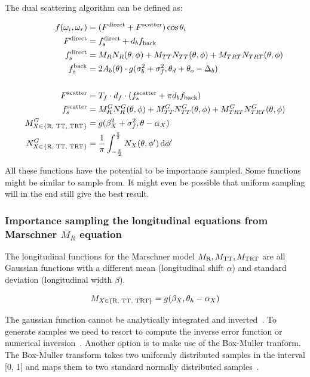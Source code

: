 \documentclass[12pt,a4paper,twoside]{article}
\begin{document}
The dual scattering algorithm can be defined as:

\begin{align}
f(\omega_i, \omega_r) & = (F^{\textnormal{direct}} + F^{\textnormal{scatter}}) \cos \theta_i\\
F^{\textnormal{direct}} & = f_s^{\textnormal{direct}} + d_b f_{\textnormal{back}}\\
f^{\textnormal{direct}}_s & = M_RN_R(\theta, \phi) + M_{TT}N_{TT}(\theta, \phi) + M_{TRT}N_{TRT}(\theta,\phi)\\
f^{\textnormal{back}}_s & = 2A_b(\theta) \cdot g(\sigma_b^2 + \sigma_f^2, \theta_d + \theta_o -\Delta_b)\\
\\
F^{\textnormal{scatter}} & = T_f \cdot d_f \cdot (f^{\textnormal{scatter}}_s + \pi d_b f_{\textnormal{back}})\\
f^{\textnormal{scatter}}_s & = M^G_RN^G_R(\theta, \phi) + M^G_{TT}N^G_{TT}(\theta, \phi) + M^G_{TRT}N^G_{TRT}(\theta,\phi)\\
M^G_{X \in \{\textnormal{R, TT, TRT}\}} & = g(\beta_X^2 + \sigma_f^2, \theta - \alpha_X)\\
N^G_{X \in \{\textnormal{R, TT, TRT}\}} & = \frac{1}{\pi} \int_{-\frac{\pi}{2}}^{\frac{\pi}{2}} N_X(\theta, \phi') \dd{\phi'}
\end{align}

All these functions have the potential to be importance sampled. Some functions might be similar to sample from. It might even be possible that uniform sampling will in the end still give the best result.

\subsubsection{Importance sampling the longitudinal equations from Marschner $M_R$ equation}
\label{importance-sampling-marschner-R}

The longitudinal functions for the Marschner model $M_{\textnormal{R}}, M_{\textnormal{TT}}, M_\textnormal{{TRT}}$ are all Gaussian functions with a different mean (longitudinal shift $\alpha$) and standard deviation (longitudinal width $\beta$).

\begin{equation}
M_{X \in \{\textnormal{R, TT, TRT}\}} = g(\beta_X, \theta_h - \alpha_X)
\end{equation}

The gaussian function cannot be analytically integrated and inverted~\cite{pixarmemo}. To generate samples we need to resort to compute the inverse error function or numerical inversion~\cite{pixarmemo}. Another option is to make use of the Box-Muller tranform. The Box-Muller transform takes two uniformly distributed samples in the interval [0, 1] and maps them to two standard normally distributed samples~\cite{box-muller}.
\end{document}
